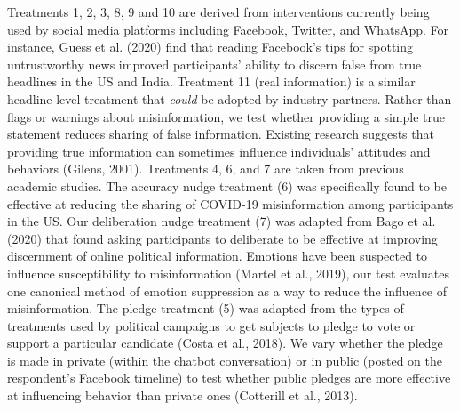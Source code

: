 \documentclass[letterpaper, 12pt, parskip=full,DIV=10]{scrartcl}
\begin{document}
Treatments 1, 2, 3, 8, 9 and 10 are derived from interventions currently being used by social media platforms including Facebook, Twitter, and WhatsApp. For instance, Guess et al. (2020) find that reading Facebook's tips for spotting untrustworthy news improved participants' ability to discern false from true headlines in the US and India. Treatment 11 (real information) is a similar headline-level treatment that \textit{could} be adopted by industry partners. Rather than flags or warnings about misinformation, we test whether providing a simple true statement reduces sharing of false information. Existing research suggests that providing true information can sometimes influence individuals' attitudes and behaviors (Gilens, 2001). Treatments 4, 6, and 7 are taken from previous academic studies. The accuracy nudge treatment (6) was specifically found to be effective at reducing the sharing of COVID-19 misinformation among participants in the US. Our deliberation nudge treatment (7) was adapted from Bago et al. (2020) that found asking participants to deliberate to be effective at improving discernment of online political information. Emotions have been suspected to influence susceptibility to misinformation (Martel et al., 2019), our test evaluates one canonical method of emotion suppression as a way to reduce the influence of misinformation. The pledge treatment (5) was adapted from the types of treatments used by political campaigns to get subjects to pledge to vote or support a particular candidate (Costa et al., 2018). We vary whether the pledge is made in private (within the chatbot conversation) or in public (posted on the respondent's Facebook timeline) to test whether public pledges are more effective at influencing behavior than private ones (Cotterill et al., 2013). 
\end{document}

